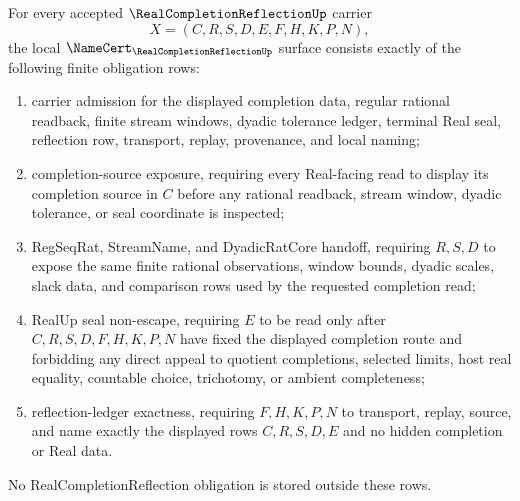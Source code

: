 \begin{theorem}
\label{thm:real-completion-reflection-namecert-obligations}
For every accepted $\RealCompletionReflectionUp$ carrier
$$
X=(C,R,S,D,E,F,H,K,P,N),
$$
the local $\NameCert_{\RealCompletionReflectionUp}$ surface consists exactly of the following finite obligation rows:
\begin{enumerate}
\item carrier admission for the displayed completion data, regular rational readback, finite stream windows, dyadic tolerance ledger, terminal Real seal, reflection row, transport, replay, provenance, and local naming;
\item completion-source exposure, requiring every Real-facing read to display its completion source in $C$ before any rational readback, stream window, dyadic tolerance, or seal coordinate is inspected;
\item RegSeqRat, StreamName, and DyadicRatCore handoff, requiring $R,S,D$ to expose the same finite rational observations, window bounds, dyadic scales, slack data, and comparison rows used by the requested completion read;
\item RealUp seal non-escape, requiring $E$ to be read only after $C,R,S,D,F,H,K,P,N$ have fixed the displayed completion route and forbidding any direct appeal to quotient completions, selected limits, host real equality, countable choice, trichotomy, or ambient completeness;
\item reflection-ledger exactness, requiring $F,H,K,P,N$ to transport, replay, source, and name exactly the displayed rows $C,R,S,D,E$ and no hidden completion or Real data.
\end{enumerate}
No RealCompletionReflection obligation is stored outside these rows.
\end{theorem}
